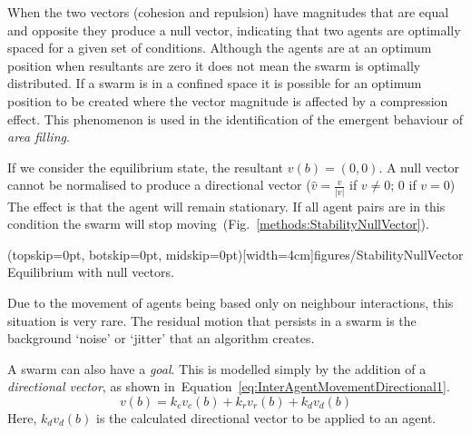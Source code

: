 \documentclass{ieeeaccess}
\begin{document}

When the two vectors (cohesion and repulsion) have magnitudes that are equal
and opposite they produce a null vector, indicating that two agents are
optimally spaced for a given set of conditions. Although the agents are at an
optimum position when resultants are zero it does not mean the swarm is
optimally distributed. If a swarm is in a confined space it is possible for an
optimum position to be created where the vector magnitude is affected by a
compression effect. This phenomenon is used in the identification of the
emergent behaviour of \textit{area filling}.  

If we consider the equilibrium state, %
the resultant $v(b)=(0,0)$. A null vector cannot be normalised to produce a
directional vector ($\hat{v} = \frac{v}{|v|}$ if $v\neq0$; $0$ if $v=0$) The
effect is that the agent will remain stationary. If all agent pairs are in this
condition the swarm will stop moving~(Fig.~\ref{methods:StabilityNullVector}).

\Figure[t!](topskip=0pt, botskip=0pt, midskip=0pt)[width=4cm]{figures/StabilityNullVector}
{Equilibrium with null vectors.\label{methods:StabilityNullVector}}


Due to the movement of agents being based only on neighbour interactions, this
situation is very rare. The residual motion that persists in a swarm is the
background `noise' or `jitter' that an algorithm creates.

A swarm can also have a \emph{goal}. This is modelled simply by the addition of 
a \textit{directional vector}, as shown in~Equation~\ref{eq:InterAgentMovementDirectional1}.
\begin{equation}\label{eq:InterAgentMovementDirectional1}
v(b) = k_cv_{c}(b) + k_rv_{r}(b) + k_dv_{d}(b)
\end{equation}
Here, $k_dv_{d}(b)$ is the
calculated directional vector to be applied to an agent.
\end{document}
